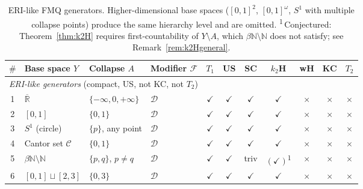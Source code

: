 \documentclass[11pt]{article}
\theoremstyle{definition}
\theoremstyle{remark}
\begin{document}
\begin{table}[h]
\centering
\small
\begin{tabular}{clllccccccc}
\hline
$\#$ & Base space $Y$ & Collapse $A$ & Modifier $\mathcal{F}$ &
$T_1$ & US & SC & $k_2$H & wH & KC & $T_2$ \\
\hline
\multicolumn{11}{l}{\emph{ERI-like generators} (compact, US, not KC, not $T_2$)} \\
\hline
1 & $\overline{\mathbb{R}}$ & $\{-\infty,0,+\infty\}$ & $\mathcal{D}$ &
  $\checkmark$ & $\checkmark$ & $\checkmark$ & $\checkmark$ & $\times$ & $\times$ & $\times$ \\
2 & $[0,1]$ & $\{0,1\}$ & $\mathcal{D}$ &
  $\checkmark$ & $\checkmark$ & $\checkmark$ & $\checkmark$ & $\times$ & $\times$ & $\times$ \\
3 & $S^1$ (circle) & $\{p\}$, any point & $\mathcal{D}$ &
  $\checkmark$ & $\checkmark$ & $\checkmark$ & $\checkmark$ & $\times$ & $\times$ & $\times$ \\
4 & Cantor set $\mathcal{C}$ & $\{0,1\}$ & $\mathcal{D}$ &
  $\checkmark$ & $\checkmark$ & $\checkmark$ & $\checkmark$ & $\times$ & $\times$ & $\times$ \\
5 & $\beta\mathbb{N} \setminus \mathbb{N}$ & $\{p,q\}$, $p \neq q$ & $\mathcal{D}$ &
  $\checkmark$ & $\checkmark$ & triv & $(\checkmark)$\textsuperscript{1} & $\times$ & $\times$ & $\times$ \\
6 & $[0,1] \sqcup [2,3]$ & $\{0,3\}$ & $\mathcal{D}$ &
  $\checkmark$ & $\checkmark$ & $\checkmark$ & $\checkmark$ & $\times$ & $\times$ & $\times$ \\
\hline
\end{tabular}
\caption{ERI-like FMQ generators. Higher-dimensional base spaces
($[0,1]^2$, $[0,1]^\omega$, $S^1$ with multiple collapse points) produce
the same hierarchy level and are omitted.
\textsuperscript{1}\,Conjectured: Theorem~\ref{thm:k2H} requires
first-countability of $Y \setminus A$, which
$\beta\mathbb{N} \setminus \mathbb{N}$ does not satisfy; see
Remark~\ref{rem:k2Hgeneral}.}
\label{tbl:eri-like}
\end{table}
\end{document}
